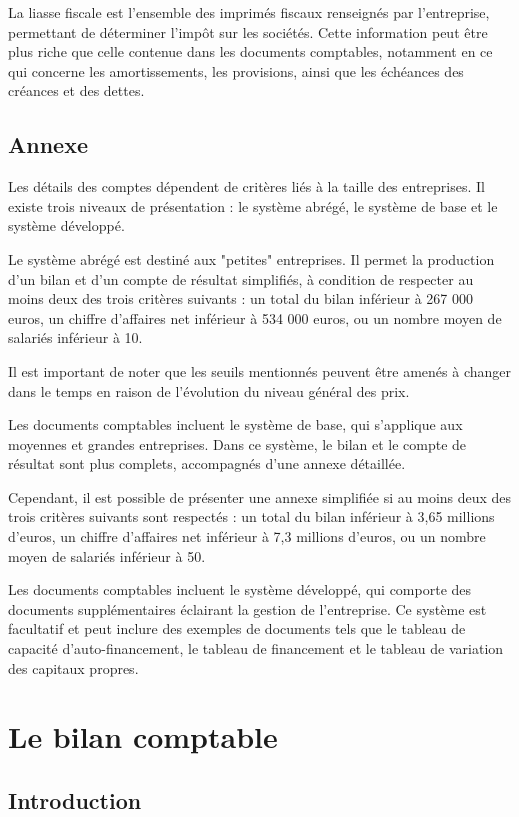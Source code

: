 \documentclass[a4paper, 12pt]{report}
\begin{document}
La liasse fiscale est l'ensemble des imprimés fiscaux renseignés par l'entreprise, permettant de déterminer l'impôt sur les sociétés. Cette information peut être plus riche que celle contenue dans les documents comptables, notamment en ce qui concerne les amortissements, les provisions, ainsi que les échéances des créances et des dettes.

\section{Annexe}

Les détails des comptes dépendent de critères liés à la taille des entreprises. Il existe trois niveaux de présentation : le système abrégé, le système de base et le système développé.

Le système abrégé est destiné aux "petites" entreprises. Il permet la production d'un bilan et d'un compte de résultat simplifiés, à condition de respecter au moins deux des trois critères suivants : un total du bilan inférieur à 267 000 euros, un chiffre d'affaires net inférieur à 534 000 euros, ou un nombre moyen de salariés inférieur à 10.

Il est important de noter que les seuils mentionnés peuvent être amenés à changer dans le temps en raison de l'évolution du niveau général des prix.

Les documents comptables incluent le système de base, qui s'applique aux moyennes et grandes entreprises. Dans ce système, le bilan et le compte de résultat sont plus complets, accompagnés d'une annexe détaillée.

Cependant, il est possible de présenter une annexe simplifiée si au moins deux des trois critères suivants sont respectés : un total du bilan inférieur à 3,65 millions d'euros, un chiffre d'affaires net inférieur à 7,3 millions d'euros, ou un nombre moyen de salariés inférieur à 50.

Les documents comptables incluent le système développé, qui comporte des documents supplémentaires éclairant la gestion de l'entreprise. Ce système est facultatif et peut inclure des exemples de documents tels que le tableau de capacité d'auto-financement, le tableau de financement et le tableau de variation des capitaux propres.

\chapter{Le bilan comptable}

\section*{Introduction}
\end{document}
